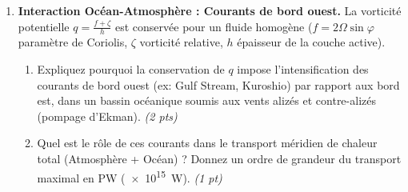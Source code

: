 \documentclass[11pt]{article}
\begin{document}
\begin{exercice}
\begin{enumerate}
    \item \textbf{Interaction Océan-Atmosphère : Courants de bord ouest.} La vorticité potentielle $q = \frac{f + \zeta}{h}$ est conservée pour un fluide homogène ($f=2\Omega\sin\varphi$ paramètre de Coriolis, $\zeta$ vorticité relative, $h$ épaisseur de la couche active).
    \begin{enumerate}
        \item Expliquez pourquoi la conservation de $q$ impose l'intensification des courants de bord ouest (ex: Gulf Stream, Kuroshio) par rapport aux bord est, dans un bassin océanique soumis aux vents alizés et contre-alizés (pompage d'Ekman). \textit{(2 pts)}
        \item Quel est le rôle de ces courants dans le transport méridien de chaleur total (Atmosphère + Océan) ? Donnez un ordre de grandeur du transport maximal en PW (\SI{e15}{W}). \textit{(1 pt)}
    \end{enumerate}
\end{enumerate}
\end{exercice}
\end{document}
